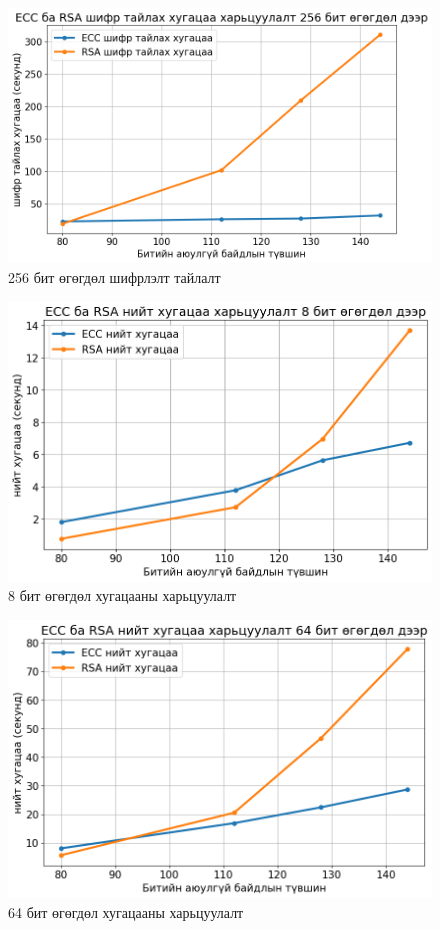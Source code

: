 	\begin{figure}[h]
		\centering
		\includegraphics[scale=0.65]{assets/graphs/6.png}
		\caption{256 бит өгөгдөл шифрлэлт тайлалт}
		\label{fig:architecture}
	\end{figure}
	\begin{figure}[h]
		\centering
		\includegraphics[scale=0.65]{assets/graphs/7.png}
		\caption{8 бит өгөгдөл хугацааны харьцуулалт}
		\label{fig:architecture}
	\end{figure}
	\begin{figure}[h]
		\centering
		\includegraphics[scale=0.65]{assets/graphs/8.png}
		\caption{64 бит өгөгдөл хугацааны харьцуулалт}
		\label{fig:architecture}
	\end{figure}
